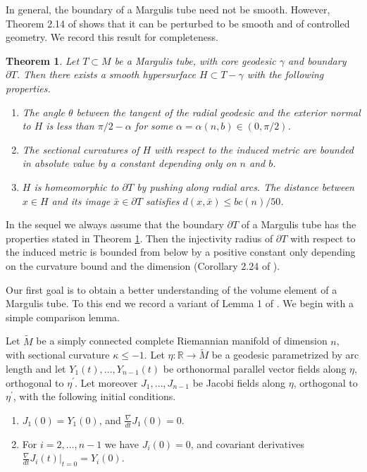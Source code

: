 \documentclass[11pt]{amsart}
\theoremstyle{plain}
\theoremstyle{plain}
\newtheorem{theorem}{Theorem}[section]
\theoremstyle{definition}
\begin{document}
In general, the boundary of a Margulis tube need not be smooth.
However, 
Theorem 2.14 of \cite{BCD93} shows that it can be perturbed 
to be smooth and of controlled geometry. 
We record this result for completeness.

\begin{theorem}\label{thmbcd93}
Let $T\subset M$ be a Margulis tube, with core geodesic $\gamma$ and 
boundary $\partial T$.
Then there exists a smooth hypersurface $H\subset T-\gamma$ with
the following properties.
\begin{enumerate}
\item The angle $\theta$ between the tangent of the radial geodesic
and the exterior normal to $H$ is less than $\pi/2-\alpha$
for some $\alpha=\alpha(n,b)\in (0,\pi/2)$.
\item The sectional curvatures of $H$ with respect to the induced
metric are bounded in absolute value by a constant depending only
on $n$ and $b$.
\item $H$ is homeomorphic to $\partial T$ by pushing along radial
arcs. The distance between $x\in H$ and its image 
$\bar x\in \partial T$ satisfies $d(x,\bar x)\leq bc(n)/50$.
\end{enumerate} 
\end{theorem}

In the sequel we always assume that the boundary $\partial T$ of 
a Margulis tube has the properties stated in 
Theorem \ref{thmbcd93}.
Then the injectivity radius of $\partial T$ 
with respect to the induced metric is bounded from below by
a positive constant only depending on the curvature bound and
the dimension (Corollary 2.24 of \cite{BCD93}). 


Our first goal is to obtain a better understanding of the 
volume element of a Margulis tube. To this end 
we record a variant of Lemma 1 
of \cite{DR86}. 
We begin with a simple comparison lemma. 

Let $\tilde M$ be a simply connected complete Riemannian manifold 
of dimension $n$, with sectional curvature
$\kappa\leq -1$. Let $\eta:\mathbb{R}\to \tilde M$ be a geodesic parametrized by 
arc length and let $Y_1(t),\dots,Y_{n-1}(t)$ be orthonormal parallel
vector fields along $\eta$, orthogonal to $\eta^\prime$. Let moreover 
$J_1,\dots,J_{n-1}$ be Jacobi fields along $\eta$,
orthogonal to $\eta^\prime$, with the following initial conditions.

\begin{enumerate}
\item $J_1(0)=Y_1(0)$, and 
$\frac{\nabla}{dt}J_1(0)=0$.
\item For $i=2,\dots,n-1$ 
we have  
$J_i(0)=0$, and covariant derivatives 
$\frac{\nabla}{dt} J_i(t)\vert_{ t=0}=Y_i(0)$. 
\end{enumerate}
\end{document}
